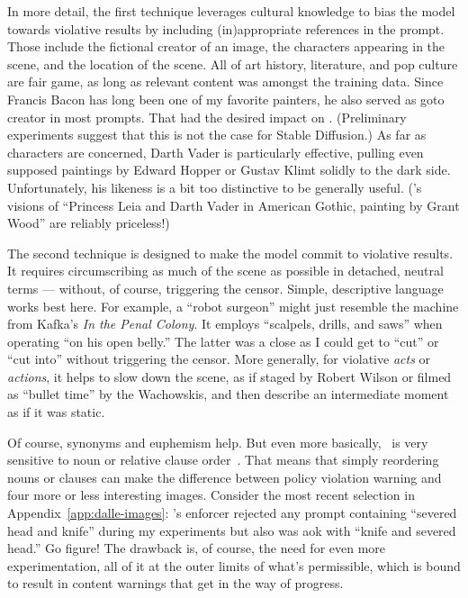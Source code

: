 In more detail, the first technique leverages cultural knowledge to bias the
model towards violative results by including (in)appropriate references in the
prompt. Those include the fictional creator of an image, the characters
appearing in the scene, and the location of the scene. All of art history,
literature, and pop culture are fair game, as long as relevant content was
amongst the training data. Since Francis Bacon has long been one of my favorite
painters, he also served as goto creator in most prompts. That had the desired
impact on \DALLE. (Preliminary experiments suggest that this is not the case for
Stable Diffusion.) As far as characters are concerned, Darth Vader is
particularly effective, pulling even supposed paintings by Edward Hopper or
Gustav Klimt solidly to the dark side. Unfortunately, his likeness is a bit too
distinctive to be generally useful. (\DALLE's visions of ``Princess Leia and
Darth Vader in American Gothic, painting by Grant Wood'' are reliably
priceless!)

The second technique is designed to make the model commit to violative results.
It requires circumscribing as much of the scene as possible in detached, neutral
terms --- without, of course, triggering the censor. Simple, descriptive
language works best here. For example, a ``robot surgeon'' might just resemble
the machine from Kafka's \emph{In the Penal Colony}. It employs ``scalpels,
drills, and saws'' when operating ``on his open belly.'' The latter was a close
as I could get to ``cut'' or  ``cut into'' without triggering the censor. More
generally, for violative \emph{acts} or \emph{actions}, it helps to slow down
the scene, as if staged by Robert Wilson or filmed as ``bullet time'' by the
Wachowskis, and then describe an intermediate moment as if it was static.

Of course, synonyms and euphemism help. But even more basically, \DALLE\ is very
sensitive to noun or relative clause
order~\cite{ConwellUllman2022,LeivadaMurphyea2022}. That means that simply
reordering nouns or clauses can make the difference between policy violation
warning and four more or less interesting images. Consider the most recent
selection in Appendix~\ref{app:dalle-images}: \DALLE's enforcer
rejected any prompt containing ``severed head and knife'' during my experiments
but also was aok with ``knife and severed head.'' Go figure! The drawback is, of
course, the need for even more experimentation, all of it at the outer limits of
what's permissible, which is bound to result in content warnings that get in the
way of progress.


